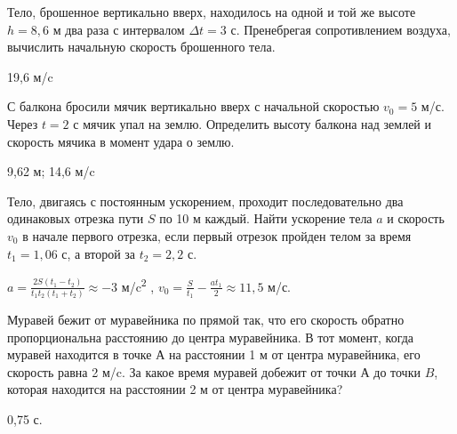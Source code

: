 \begin{ex} %
Тело, брошенное вертикально вверх, находилось на одной и той же высоте $h = 8,6$ м два раза с интервалом $\Delta t = 3$ с. Пренебрегая сопротивлением воздуха, вычислить начальную скорость брошенного тела.
\begin{ans}
19,6 м/c
\end{ans}
\end{ex}

\begin{ex} %
С балкона бросили мячик вертикально вверх с начальной скоростью $v_0 = 5$ м/с. Через $t = 2$ с мячик упал на землю. Определить высоту балкона над землей и скорость мячика в момент удара о землю.
\begin{ans}
9,62 м; 14,6 м/c
\end{ans}
\end{ex}

\complexProblems

\begin{ex} %
Тело, двигаясь с постоянным ускорением, проходит последовательно два одинаковых отрезка пути $S$ по 10 м каждый. Найти ускорение тела $a$ и скорость $v_0$ в начале первого отрезка, если первый отрезок пройден телом за время $t_1 = 1,06$ с, а второй за $t_2 = 2,2$ с.
\begin{ans}
$a = \frac{2S\left(t_1-t_2\right)}{t_1t_2\left(t_1+t_2\right)} \approx -3$ м/c\textsuperscript{2} , $v_0 = \frac{S}{t_1}-\frac{at_1}{2} \approx 11,5$ м/с.
\end{ans}
\end{ex}

\begin{ex} %
Муравей бежит от муравейника по прямой так, что его скорость обратно пропорциональна расстоянию до центра муравейника. В тот момент, когда муравей находится в точке $А$ на расстоянии 1 м от центра муравейника, его скорость равна 2 м/c. За какое время муравей добежит от точки А до точки $B$, которая находится на расстоянии 2 м от центра муравейника?
\begin{ans}
0,75 с.
\end{ans}
\end{ex}

\clearpage